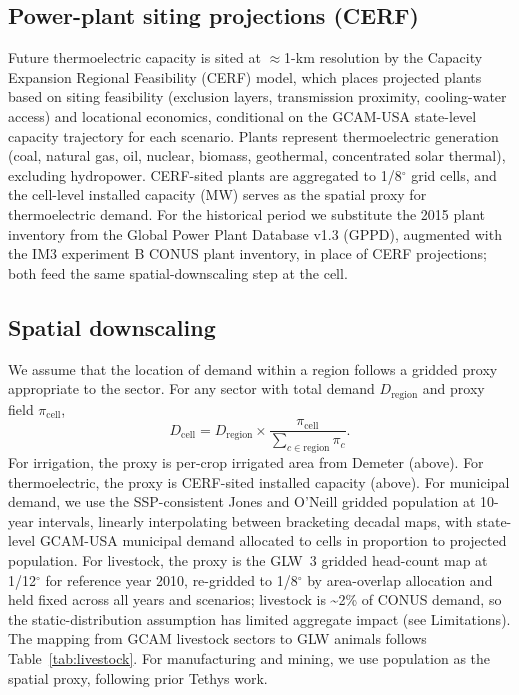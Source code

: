 \documentclass[fleqn,10pt]{wlscirep}
\begin{document}
\subsection*{Power-plant siting projections (CERF)}

Future thermoelectric capacity is sited at $\approx$1-km resolution by the Capacity Expansion Regional Feasibility (CERF) model\cite{Vernon2021,Mongird2025CERF}, which places projected plants based on siting feasibility (exclusion layers, transmission proximity, cooling-water access) and locational economics, conditional on the GCAM-USA state-level capacity trajectory for each scenario. Plants represent thermoelectric generation (coal, natural gas, oil, nuclear, biomass, geothermal, concentrated solar thermal), excluding hydropower. CERF-sited plants are aggregated to 1/8$^{\circ}$ grid cells, and the cell-level installed capacity (MW) serves as the spatial proxy for thermoelectric demand. For the historical period we substitute the 2015 plant inventory from the Global Power Plant Database v1.3 (GPPD), augmented with the IM3 experiment B CONUS plant inventory, in place of CERF projections; both feed the same spatial-downscaling step at the cell.

\subsection*{Spatial downscaling}

We assume that the location of demand within a region follows a gridded proxy appropriate to the sector. For any sector with total demand $D_{\mathrm{region}}$ and proxy field $\pi_{\mathrm{cell}}$,
\begin{equation}
D_{\mathrm{cell}} = D_{\mathrm{region}} \times \frac{\pi_{\mathrm{cell}}}{\sum_{c \in \mathrm{region}} \pi_{c}}.
\label{eq:spatial}
\end{equation}
For irrigation, the proxy is per-crop irrigated area from Demeter (above). For thermoelectric, the proxy is CERF-sited installed capacity (above). For municipal demand, we use the SSP-consistent Jones and O'Neill\cite{Jones_2016} gridded population at 10-year intervals, linearly interpolating between bracketing decadal maps, with state-level GCAM-USA municipal demand allocated to cells in proportion to projected population. For livestock, the proxy is the GLW~3 gridded head-count map\cite{Gilbert2018} at 1/12$^{\circ}$ for reference year 2010, re-gridded to 1/8$^{\circ}$ by area-overlap allocation and held fixed across all years and scenarios; livestock is \textasciitilde2\% of CONUS demand, so the static-distribution assumption has limited aggregate impact (see Limitations). The mapping from GCAM livestock sectors to GLW animals follows Table~\ref{tab:livestock}. For manufacturing and mining, we use population as the spatial proxy, following prior Tethys work\cite{Khan2023}.
\end{document}
